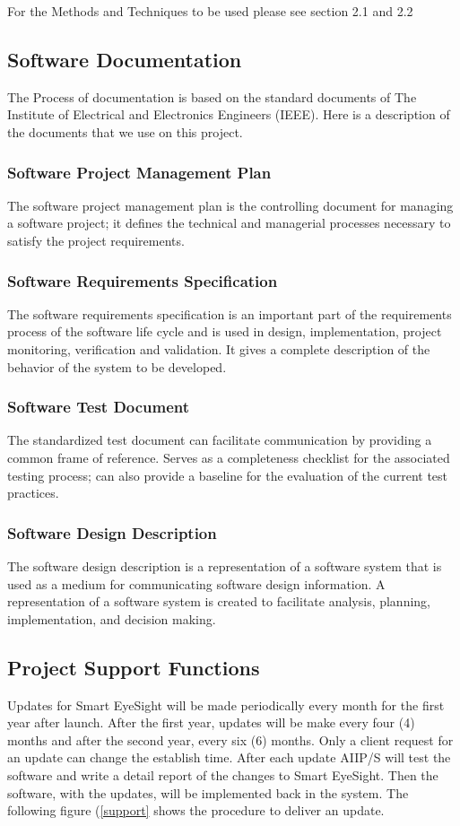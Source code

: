 \documentclass[12pt]{article}
\begin{document}
For the Methods and Techniques to be used please see section 2.1 and 2.2

\subsection{Software Documentation}
The Process of documentation is based on the standard documents of The Institute of Electrical and Electronics Engineers (IEEE). Here is a description of the documents that we use on this project.

\subsubsection{Software Project Management Plan}
The software project management plan is the controlling document for managing a software project; it defines the technical and managerial processes necessary to satisfy the project requirements.

\subsubsection{Software Requirements Specification}
The software requirements specification is an important part of the requirements process of the software life cycle and is used in design, implementation, project monitoring, verification and validation. It gives a complete description of the behavior of the system to be developed.

\subsubsection{Software Test Document}
The standardized test document can facilitate communication by providing a common frame of reference. Serves as a completeness checklist for the associated testing process; can also provide a baseline for the evaluation of the current test practices.

\subsubsection{Software Design Description}
The software design description is a representation of a software system that is used as a medium for communicating software design information. A representation of a software system is created to facilitate analysis, planning, implementation, and decision making.

\subsection{Project Support Functions}
Updates for Smart EyeSight will be made periodically every month for the first year after launch. After the first year, updates will be make every four (4) months and after the second year, every six (6) months. Only a client request for an update can change the establish time. After each update AIIP/S will test the software and write a detail report of the changes to Smart EyeSight. Then the software, with the updates, will be implemented back in the system. The following figure (\ref{support} shows the procedure to deliver an update.
\end{document}
